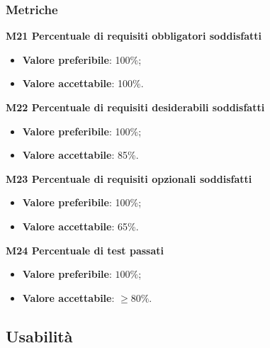        \subsubsection{Metriche}
            \textbf{M21 Percentuale di requisiti obbligatori soddisfatti}
                \begin{itemize}
                    \item \textbf{Valore preferibile}: 100\%;
                    \item \textbf{Valore accettabile}: 100\%.
                \end{itemize}
            \textbf{M22 Percentuale di requisiti desiderabili soddisfatti}
            \begin{itemize}
            	\item \textbf{Valore preferibile}: 100\%;
            	\item \textbf{Valore accettabile}: 85\%.
            \end{itemize}
        	\textbf{M23 Percentuale di requisiti opzionali soddisfatti}
        	\begin{itemize}
        		\item \textbf{Valore preferibile}: 100\%;
        		\item \textbf{Valore accettabile}: 65\%.
        	\end{itemize}
        	\textbf{M24 Percentuale di test passati}
        	\begin{itemize}
        		\item \textbf{Valore preferibile}: $100\%$;
        		\item \textbf{Valore accettabile}: $\ge 80\%$.
        	\end{itemize}
    \subsection{Usabilità}

